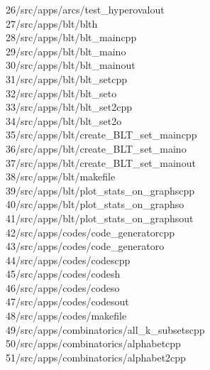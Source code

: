 \begin{tabbing}
26\>/src/apps/arcs/test\_hyperovalout\\[0pt]
27\>/src/apps/blt/blth\\[0pt]
28\>/src/apps/blt/blt\_maincpp\\[0pt]
29\>/src/apps/blt/blt\_maino\\[0pt]
30\>/src/apps/blt/blt\_mainout\\[0pt]
31\>/src/apps/blt/blt\_setcpp\\[0pt]
32\>/src/apps/blt/blt\_seto\\[0pt]
33\>/src/apps/blt/blt\_set2cpp\\[0pt]
34\>/src/apps/blt/blt\_set2o\\[0pt]
35\>/src/apps/blt/create\_BLT\_set\_maincpp\\[0pt]
36\>/src/apps/blt/create\_BLT\_set\_maino\\[0pt]
37\>/src/apps/blt/create\_BLT\_set\_mainout\\[0pt]
38\>/src/apps/blt/makefile\\[0pt]
39\>/src/apps/blt/plot\_stats\_on\_graphscpp\\[0pt]
40\>/src/apps/blt/plot\_stats\_on\_graphso\\[0pt]
41\>/src/apps/blt/plot\_stats\_on\_graphsout\\[0pt]
42\>/src/apps/codes/code\_generatorcpp\\[0pt]
43\>/src/apps/codes/code\_generatoro\\[0pt]
44\>/src/apps/codes/codescpp\\[0pt]
45\>/src/apps/codes/codesh\\[0pt]
46\>/src/apps/codes/codeso\\[0pt]
47\>/src/apps/codes/codesout\\[0pt]
48\>/src/apps/codes/makefile\\[0pt]
49\>/src/apps/combinatorics/all\_k\_subsetscpp\\[0pt]
50\>/src/apps/combinatorics/alphabetcpp\\[0pt]
51\>/src/apps/combinatorics/alphabet2cpp\\[0pt]

\end{tabbing}
